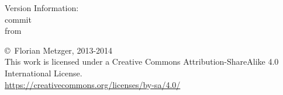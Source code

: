 \newpage
\thispagestyle{empty}
\begin{center}
{\color{red}
Version Information: \\
commit \gitAbbrevHash \\
from \gitAuthorIsoDate 
}
\end{center}
\vfill
\begin{center}
\copyright~Florian Metzger, 2013-2014\\
This work is licensed under a Creative Commons Attribution-ShareAlike 4.0 International License.\\
\url{https://creativecommons.org/licenses/by-sa/4.0/}
\vskip 0.5cm
\ccbysa
\end{center}
